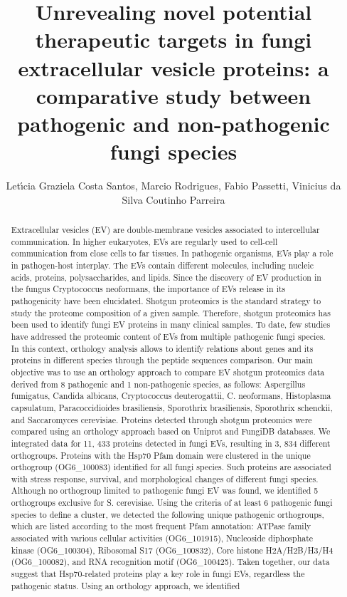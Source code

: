 \documentclass[twoside]{article}
\title{\vspace{-15mm}\fontsize{24pt}{10pt}\selectfont\textbf{ Unrevealing novel potential therapeutic targets in fungi extracellular vesicle proteins: a comparative study between pathogenic and non-pathogenic fungi species }} %
\author{ Let\'{\i}cia Graziela Costa Santos,  Marcio Rodrigues,  Fabio Passetti,  Vinicius da Silva Coutinho Parreira }
\affil{ Fiocruz-PR,  Fiocruz,  Instituto Carlos Chagas,  Fiocruz }
\date{}
\begin{document}
  
  
  \maketitle %
  
  
  \thispagestyle{fancy} %
  
  
  \begin{abstract}
  Extracellular vesicles (EV) are double-membrane vesicles associated to intercellular communication. In higher eukaryotes,  EVs are regularly used to cell-cell communication from close cells to far tissues. In pathogenic organisms,  EVs play a role in pathogen-host interplay. The EVs contain different molecules,  including nucleic acids,  proteins,  polysaccharides,  and lipids. Since the discovery of EV production in the fungus Cryptococcus neoformans,  the importance of EVs release in its pathogenicity have been elucidated. Shotgun proteomics is the standard strategy to study the proteome composition of a given sample. Therefore,  shotgun proteomics has been used to identify fungi EV proteins in many clinical samples. To date,  few studies have addressed the proteomic content of EVs from multiple pathogenic fungi species. In this context,  orthology analysis allows to identify relations about genes and its proteins in different species through the peptide sequences comparison. Our main objective was to use an orthology approach to compare EV shotgun proteomics data derived from 8 pathogenic and 1 non-pathogenic species,  as follows: Aspergillus fumigatus,  Candida albicans,  Cryptococcus deuterogattii,  C. neoformans,  Histoplasma capsulatum,  Paracoccidioides brasiliensis,  Sporothrix brasiliensis,  Sporothrix schenckii,  and Saccaromyces cerevisiae. Proteins detected through shotgun proteomics were compared using an orthology approach based on Uniprot and FungiDB databases. We integrated data for 11, 433 proteins detected in fungi EVs,  resulting in 3, 834 different orthogroups. Proteins with the Hsp70 Pfam domain were clustered in the unique orthogroup (OG6\_100083) identified for all fungi species. Such proteins are associated with stress response,  survival,  and morphological changes of different fungi species. Although no orthogroup limited to pathogenic fungi EV was found,  we identified 5 orthogroups exclusive for S. cerevisiae. Using the criteria of at least 6 pathogenic fungi species to define a cluster,  we detected the following unique pathogenic orthogroups,  which are listed according to the most frequent Pfam annotation: ATPase family associated with various cellular activities (OG6\_101915),  Nucleoside diphosphate kinase (OG6\_100304),  Ribosomal S17 (OG6\_100832),  Core histone H2A/H2B/H3/H4 (OG6\_100082),  and RNA recognition motif (OG6\_100425).  Taken together,  our data suggest that Hsp70-related proteins play a key role in fungi EVs,  regardless the pathogenic status. Using an orthology approach,  we identified 
\end{abstract}
\end{document}
